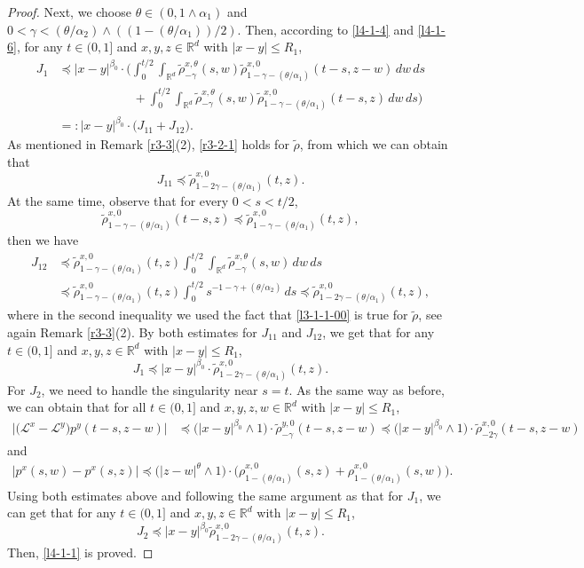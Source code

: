 \documentclass[a4paper,11pt]{amsart}
\renewcommand{\le}{\leqslant}
\newcommand{\R}{\mathds R}
\newcommand{\B}{\beta}
\newcommand{\T}{\theta}
\newcommand{\p}{\preceq}
\newcommand{\A}{\alpha}
\newcommand{\G}{\gamma}
\def\LL{{\mathcal L}}
\theoremstyle{definition}
\begin{document}
\begin{proof}
Next, we choose $\theta\in(0,1\wedge \A_1)$ and $0<\gamma<({\theta}/{\A_2})\wedge ((1-({\theta}/{\A_1}))/2)$. Then, according to
\eqref{l4-1-4} and \eqref{l4-1-6}, for any $t\in(0,1]$ and $x,y,z\in \R^d$ with $|x-y|\le R_1$,
\begin{align*}
J_1&\p |x-y|^{\B_0}\cdot\bigg(\int_0^{{t}/{2}}\int_{\R^d}\tilde \rho^{x,\T}_{-\G}(s,w)\tilde \rho^{x,0}_{1-\G-({\T}/{\A_1})}(t-s,z-w)\,dw\,ds\\
&\qquad\qquad \qquad +\int_0^{{t}/{2}}\int_{\R^d}\tilde \rho^{x,\T}_{-\G}(s,w)
\tilde \rho^{x,0}_{1-\G-({\T}/{\A_1})}(t-s,z)\,dw\,ds\bigg)\\
&=:|x-y|^{\B_0}\cdot \big(J_{11}+J_{12}\big).
\end{align*}
As mentioned in Remark \ref{r3-3}(2), \eqref{r3-2-1} holds for $\tilde \rho$, from which we can obtain that
\begin{equation*}
J_{11}\p \tilde \rho^{x,0}_{1-2\G-({\T}/{\A_1})}(t,z).
\end{equation*}
At the same time, observe that for every $0<s<{t}/{2}$,
\begin{equation*}
\tilde \rho^{x,0}_{1-\G-({\T}/{\A_1})}(t-s,z)\p \tilde
\rho^{x,0}_{1-\G-({\T}/{\A_1})}(t,z),
\end{equation*}
then we have
\begin{equation}\label{l4-1-8}
\begin{split}
J_{12}&\p \tilde \rho^{x,0}_{1-\G-({\T}/{\A_1})}(t,z)
\int_0^{{t}/{2}}\int_{\R^d}\tilde \rho^{x,\T}_{-\G}(s,w)\,dw\,ds \\
&\p \tilde \rho^{x,0}_{1-\G-({\T}/{\A_1})}(t,z) \int_0^{{t}/{2}}s^{-1-\G+({\T}/{\A_2})}\,ds \p \tilde \rho^{x,0}_{1-2\G-({\T}/{\A_1})}(t,z),
\end{split}
\end{equation}
where in the second inequality we used the fact that \eqref{l3-1-1-00} is true for $\tilde \rho$, see again
Remark \ref{r3-3}(2).
By both estimates for $J_{11}$ and $J_{12}$, we get that for any $t\in(0,1]$ and $x,y,z\in \R^d$ with $|x-y|\le R_1$,
\begin{equation*}
J_1 \p |x-y|^{\B_0}\cdot\tilde \rho^{x,0}_{1-2\G-({\T}/{\A_1})}(t,z).
\end{equation*}
 For $J_2$, we need to handle the singularity near $s=t$. As the same way as before, we can obtain that for all $t\in (0,1]$ and
$x,y,z,w\in \R^d$ with $|x-y|\le R_1$,
\begin{align*}
\big|\big( \LL^x- \LL^y\big)p^y(t-s,z-w)\big|
&\p \big(|x-y|^{\B_0}\wedge 1\big)\cdot\tilde \rho^{y,0}_{-\G}(t-s,z-w)\p \big(|x-y|^{\B_0}\wedge 1\big)\cdot \tilde \rho^{x,0}_{-2\G}(t-s,z-w)\end{align*} and
\begin{align*}
\big|p^x(s,w)-p^x(s,z)\big|\p \big(|z-w|^{\T}\wedge 1\big) \cdot\big(\rho^{x,0}_{1-({\T}/{\A_1})}(s,z)+\rho^{x,0}_{1-({\T}/{\A_1})}(s,w)\big).
\end{align*}
Using both estimates above and following the same argument as that for $J_1$, we can get that  for any $t\in(0,1]$ and $x,y,z\in \R^d$ with $|x-y|\le R_1$, $$J_2 \p
|x-y|^{\B_0}\tilde \rho^{x,0}_{1-2\G-({\T}/{\A_1})}(t,z).$$ Then, \eqref{l4-1-1} is proved.


\end{proof}
\end{document}
